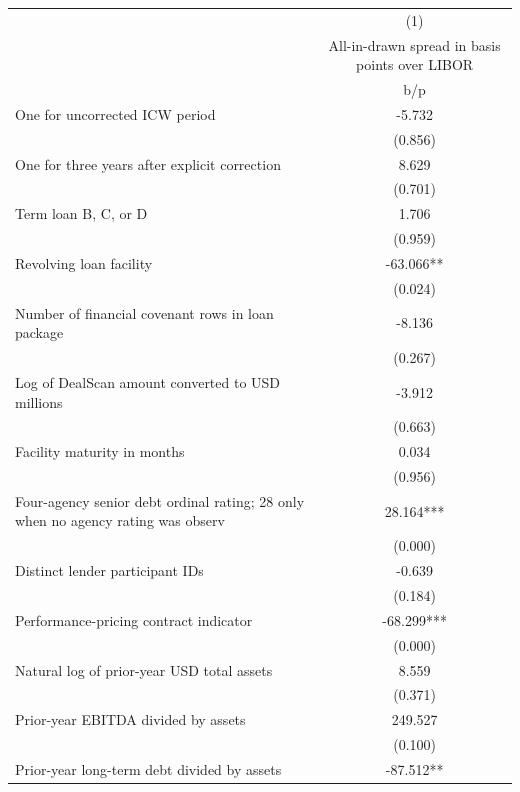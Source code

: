 {
\def\sym#1{\ifmmode^{#1}\else\(^{#1}\)\fi}
\begin{tabular}{l*{1}{c}}
\hline\hline
                    &\multicolumn{1}{c}{(1)}\\
                    &\multicolumn{1}{c}{All-in-drawn spread in basis points over LIBOR}\\
                    &         b/p   \\
\hline
One for uncorrected ICW period&      -5.732   \\
                    &     (0.856)   \\
One for three years after explicit correction&       8.629   \\
                    &     (0.701)   \\
Term loan B, C, or D&       1.706   \\
                    &     (0.959)   \\
Revolving loan facility&     -63.066** \\
                    &     (0.024)   \\
Number of financial covenant rows in loan package&      -8.136   \\
                    &     (0.267)   \\
Log of DealScan amount converted to USD millions&      -3.912   \\
                    &     (0.663)   \\
Facility maturity in months&       0.034   \\
                    &     (0.956)   \\
Four-agency senior debt ordinal rating; 28 only when no agency rating was observ&      28.164***\\
                    &     (0.000)   \\
Distinct lender participant IDs&      -0.639   \\
                    &     (0.184)   \\
Performance-pricing contract indicator&     -68.299***\\
                    &     (0.000)   \\
Natural log of prior-year USD total assets&       8.559   \\
                    &     (0.371)   \\
Prior-year EBITDA divided by assets&     249.527   \\
                    &     (0.100)   \\
Prior-year long-term debt divided by assets&     -87.512** \\

\end{tabular}}
